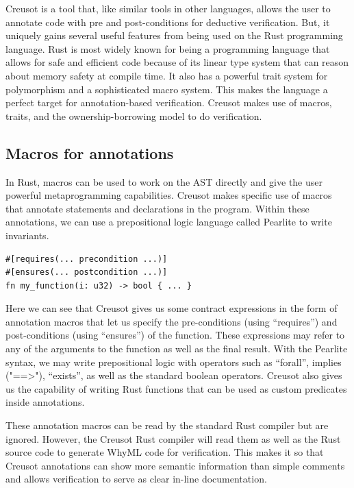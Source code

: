 \documentclass[12pt]{article}
\begin{document}

Creusot is a tool that, like similar tools in other languages, allows the user to annotate code with pre and post-conditions for deductive verification.
But, it uniquely gains several useful features from being used on the Rust programming language. 
Rust is most widely known for being a programming language that allows for safe and efficient code because of its linear type system that can reason about memory safety at compile time. 
It also has a powerful trait system for polymorphism and a sophisticated macro system. 
This makes the language a perfect target for annotation-based verification. 
Creusot makes use of macros, traits, and the ownership-borrowing model to do verification. 

\subsection{Macros for annotations}
In Rust, macros can be used to work on the AST directly and give the user powerful metaprogramming capabilities. 
Creusot makes specific use of macros that annotate statements and declarations in the program. 
Within these annotations, we can use a prepositional logic language called Pearlite to write invariants. 
\begin{verbatim}
#[requires(... precondition ...)]
#[ensures(... postcondition ...)]
fn my_function(i: u32) -> bool { ... }
\end{verbatim}

Here we can see that Creusot gives us some contract expressions in the form of annotation macros that let us specify the pre-conditions (using ``requires'') and post-conditions (using ``ensures'') of the function. 
These expressions may refer to any of the arguments to the function as well as the final result. 
With the Pearlite syntax, we may write prepositional logic with operators such as ``forall'', implies ("==>"), ``exists'', as well as the standard boolean operators. 
Creusot also gives us the capability of writing Rust functions that can be used as custom predicates inside annotations. 

These annotation macros can be read by the standard Rust compiler but are ignored. 
However, the Creusot Rust compiler will read them as well as the Rust source code to generate WhyML code for verification. 
This makes it so that Creusot annotations can show more semantic information than simple comments and allows verification to serve as clear in-line documentation. 
\end{document}
